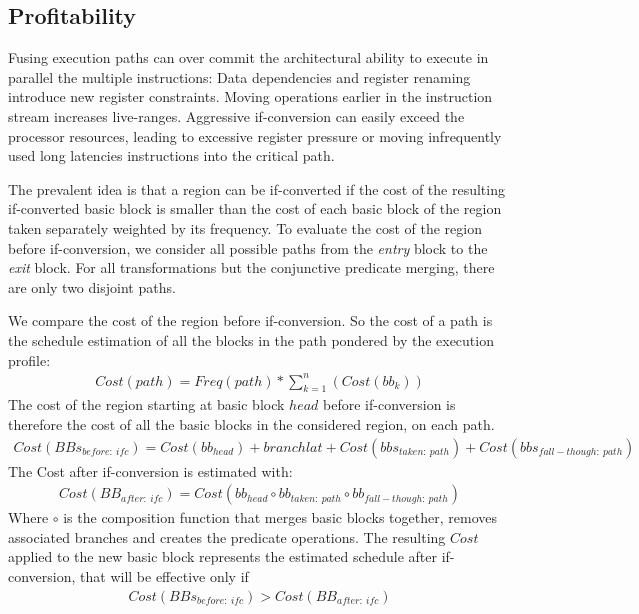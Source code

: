 \subsection{Profitability}

Fusing execution paths can over commit the architectural ability to execute in parallel the multiple instructions: Data dependencies and register renaming introduce new register constraints. Moving operations earlier in the instruction stream increases live-ranges. 
Aggressive if-conversion can easily exceed the processor resources, leading to excessive register pressure or moving infrequently used long latencies instructions into the critical path. 

The prevalent idea is that a region can be if-converted if the cost of the resulting if-converted basic block is smaller than the cost of each basic block of the region taken separately weighted by its frequency. To evaluate the cost of the region before if-conversion, we consider all possible paths from the \textit{entry} block to the \textit{exit} block. For all transformations but the conjunctive predicate merging, there are only two disjoint paths.

We compare the cost of the region before if-conversion. So the cost of a path is the schedule estimation of all the blocks in the path pondered by the execution profile:
\begin{align*}
Cost(path)=Freq(path)*\sum_{k=1}^n(Cost(bb_{k}))
\end{align*}
The cost of the region starting at basic block $head$ before if-conversion is therefore the cost of all the basic blocks in the considered region, on each path.
\begin{align*}
Cost(BBs_{before:\ ifc})=Cost(bb_{head}) + branchlat + Cost(bbs_{taken:\ path}) + Cost(bbs_{fall-though:\ path})
\end{align*}
The Cost after if-conversion is estimated with:
\begin{align*}
Cost(BB_{after:\ ifc})=Cost(bb_{head} \circ bb_{taken:\ path} \circ bb_{fall-though:\ path})
\end{align*}
Where $\circ$ is the composition function that merges basic blocks together, removes associated branches and creates the predicate operations. The resulting $Cost$ applied to the new basic block represents the estimated schedule after if-conversion, that will be effective only if
\begin{align*}
Cost(BBs_{before:\ ifc}) > Cost(BB_{after:\ ifc})
\end{align*}

